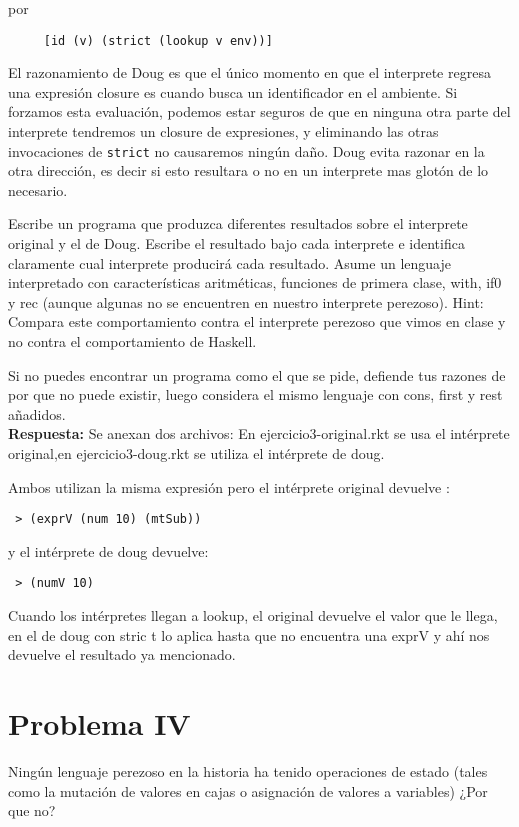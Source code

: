\documentclass[12pt]{article}
\begin{document}
por

\begin{verbatim}
     [id (v) (strict (lookup v env))]
\end{verbatim}

El razonamiento de Doug es que el único momento en que el interprete regresa una
expresión closure es cuando busca un identificador en el ambiente. Si forzamos
esta evaluación, podemos estar seguros de que en ninguna otra parte del interprete
tendremos un closure de expresiones, y eliminando las otras invocaciones de
\texttt{strict} no causaremos ningún daño. Doug evita razonar en la otra dirección,
es decir si esto resultara o no en un interprete mas glotón de lo necesario.

Escribe un programa que produzca diferentes resultados sobre el interprete original
y el de Doug. Escribe el resultado bajo cada interprete e identifica claramente
cual interprete producirá cada resultado. Asume un lenguaje interpretado
con características aritméticas, funciones de primera clase, with, if0 y rec
(aunque algunas no se encuentren en nuestro interprete perezoso). Hint: Compara
este comportamiento contra el interprete perezoso que vimos en clase y no contra
el comportamiento de Haskell.

Si no puedes encontrar un programa como el que se pide, defiende tus razones
de por que no puede existir, luego considera el mismo lenguaje con cons, first
y rest añadidos.
\\

\textbf{Respuesta: } 
Se anexan dos archivos:
En ejercicio3-original.rkt se usa el intérprete original,en ejercicio3-doug.rkt se utiliza el intérprete de doug.

Ambos utilizan la misma expresión pero el intérprete original devuelve :
\begin{verbatim}
 > (exprV (num 10) (mtSub))
 \end{verbatim}
y el intérprete de doug devuelve:
\begin{verbatim}
 > (numV 10)
 \end{verbatim} 
Cuando los intérpretes llegan a lookup, el original devuelve el valor que le llega, en el de doug con stric t lo aplica hasta que no encuentra una exprV y ahí nos devuelve el resultado ya mencionado.


\section*{Problema IV}
Ningún lenguaje perezoso en la historia ha tenido operaciones de estado (tales
como la mutación de valores en cajas o asignación de valores a variables) ¿Por
que no?
\end{document}
